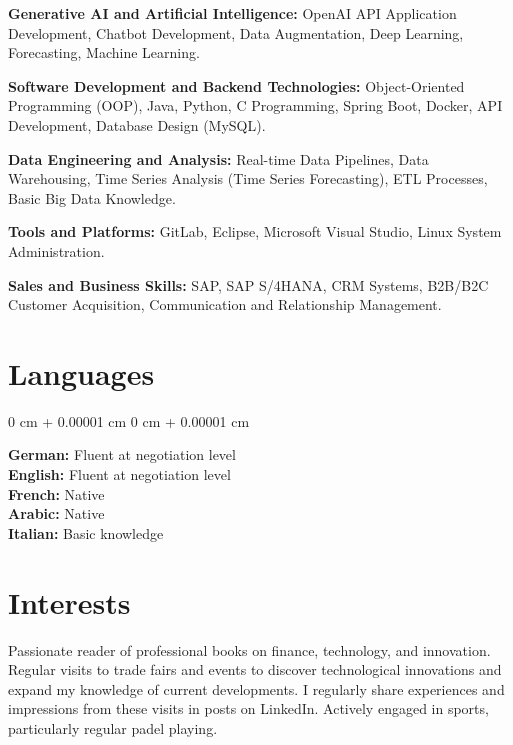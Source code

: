 \documentclass[10pt, letterpaper]{article}
\newenvironment{onecolentry}{
    \begin{adjustwidth}{
        0 cm + 0.00001 cm
    }{
        0 cm + 0.00001 cm
    }
}{
    \end{adjustwidth}
} %
\begin{document}
\textbf{Generative AI and Artificial Intelligence:}  
OpenAI API Application Development, Chatbot Development, Data Augmentation, Deep Learning, Forecasting, Machine Learning.



\textbf{Software Development and Backend Technologies:}  
Object-Oriented Programming (OOP), Java, Python, C Programming, Spring Boot, Docker, API Development, Database Design (MySQL).



\textbf{Data Engineering and Analysis:}  
Real-time Data Pipelines, Data Warehousing, Time Series Analysis (Time Series Forecasting), ETL Processes, Basic Big Data Knowledge.



\textbf{Tools and Platforms:}  
GitLab, Eclipse, Microsoft Visual Studio, Linux System Administration.



\textbf{Sales and Business Skills:}  
SAP, SAP S/4HANA, CRM Systems, B2B/B2C Customer Acquisition, Communication and Relationship Management.



    \section{Languages}

\begin{onecolentry}
    \textbf{German:} Fluent at negotiation level \\
    \textbf{English:} Fluent at negotiation level \\
    \textbf{French:} Native \\
    \textbf{Arabic:} Native \\
    \textbf{Italian:} Basic knowledge
\end{onecolentry}


\section{Interests}

Passionate reader of professional books on finance, technology, and innovation.  
Regular visits to trade fairs and events to discover technological innovations and expand my knowledge of current developments.  
I regularly share experiences and impressions from these visits in posts on LinkedIn.  
Actively engaged in sports, particularly regular padel playing.

    
\end{document}
